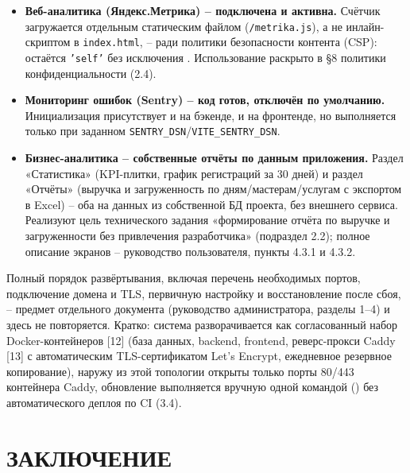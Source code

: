 \begin{itemize}
  \item \textbf{Веб-аналитика (Яндекс.Метрика) -- подключена и активна.}
        Счётчик загружается отдельным статическим файлом
        (\texttt{/metrika.js}), а не инлайн-скриптом в
        \texttt{index.html}, -- ради политики безопасности контента (CSP):
         остаётся \texttt{'self'} без исключения
        . Использование раскрыто в §8 политики
        конфиденциальности (2.4).
  \item \textbf{Мониторинг ошибок (Sentry) -- код готов, отключён по
        умолчанию.} Инициализация присутствует и на бэкенде, и на
        фронтенде, но выполняется только при заданном
        \texttt{SENTRY\_DSN}/\texttt{VITE\_SENTRY\_DSN}.
  \item \textbf{Бизнес-аналитика -- собственные отчёты по данным
        приложения.} Раздел «Статистика» (KPI-плитки, график регистраций
        за 30 дней) и раздел «Отчёты» (выручка и загруженность по
        дням/мастерам/услугам с экспортом в Excel) -- оба на данных из
        собственной БД проекта, без внешнего сервиса. Реализуют цель
        технического задания «формирование отчёта по выручке и
        загруженности без привлечения разработчика» (подраздел 2.2);
        полное описание экранов -- руководство пользователя,
        пункты 4.3.1 и 4.3.2.
\end{itemize}


Полный порядок развёртывания, включая перечень необходимых портов,
подключение домена и TLS, первичную настройку и восстановление после
сбоя, -- предмет отдельного документа (руководство администратора,
разделы 1--4) и здесь не повторяется. Кратко: система разворачивается
как согласованный набор Docker-контейнеров [12] (база данных, backend,
frontend, реверс-прокси Caddy [13] с автоматическим TLS-сертификатом
Let's Encrypt, ежедневное резервное копирование), наружу из этой
топологии открыты только порты 80/443 контейнера Caddy, обновление
выполняется вручную одной командой () без
автоматического деплоя по CI (3.4).

\section*{\hspace*{\gostindent}ЗАКЛЮЧЕНИЕ}

